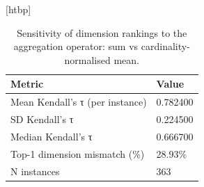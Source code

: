 \begin{table}
\small[htbp]
\caption{Sensitivity of dimension rankings to the aggregation operator: sum vs cardinality-normalised mean.}
\label{tab:A06a_aggregation_summary}
\begin{tabular}{ll}
\toprule
Metric & Value \\
\midrule
Mean Kendall's τ (per instance) & 0.782400 \\
SD Kendall's τ & 0.224500 \\
Median Kendall's τ & 0.666700 \\
Top-1 dimension mismatch (\%) & 28.93\% \\
N instances & 363 \\
\bottomrule
\end{tabular}
\end{table}
